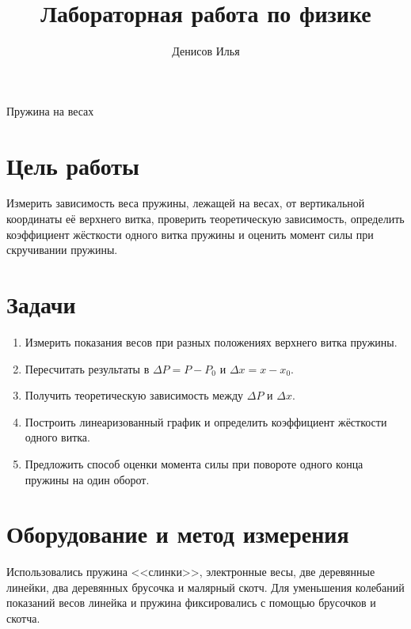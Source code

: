 \documentclass[12pt]{article}
\title{Лабораторная работа по физике}
\author{Денисов Илья}
\date{}
\begin{document}
    \maketitle

    \vspace{5cm}
    {\centering \LARGE Пружина на весах \par}

    \newpage

    \tableofcontents
    \setcounter{tocdepth}{3}

    \newpage

    \section{Цель работы}

    Измерить зависимость веса пружины, лежащей на весах, от вертикальной координаты её верхнего витка, проверить теоретическую зависимость, определить коэффициент жёсткости одного витка пружины и оценить момент силы при скручивании пружины.

    \section{Задачи}

    \begin{enumerate}
        \item Измерить показания весов при разных положениях верхнего витка пружины.
        \item Пересчитать результаты в $\Delta P = P - P_0$ и $\Delta x = x - x_0$.
        \item Получить теоретическую зависимость между $\Delta P$ и $\Delta x$.
        \item Построить линеаризованный график и определить коэффициент жёсткости одного витка.
        \item Предложить способ оценки момента силы при повороте одного конца пружины на один оборот.
    \end{enumerate}

    \section{Оборудование и метод измерения}

    Использовались пружина <<слинки>>, электронные весы, две деревянные линейки, два деревянных брусочка и малярный скотч. Для уменьшения колебаний показаний весов линейка и пружина фиксировались с помощью брусочков и скотча.
\end{document}
